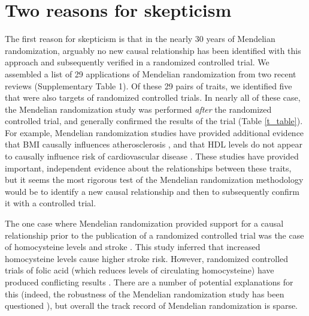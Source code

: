 \documentclass[11pt,titlepage]{article}
\begin{document}
\section{Two reasons for skepticism}
The first reason for skepticism is that in the nearly 30 years of Mendelian randomization, arguably no new causal relationship has been identified with this approach and subsequently verified in a randomized controlled trial. We assembled a list of 29 applications of Mendelian randomization from two recent reviews \citep{Davey-Smith:2014aa, burgess2015mendelian} (Supplementary Table 1). Of these 29 pairs of traits, we identified five that were also targets of randomized controlled trials. In nearly all of these case, the Mendelian randomization study was performed \emph{after} the randomized controlled trial, and generally confirmed the results of the trial (Table \ref{t_table}). For example, Mendelian randomization studies have provided additional evidence that BMI causally influences atherosclerosis \cite{Kivimaki:2008ab}, and that HDL levels do not appear to causally influence risk of cardiovascular disease \cite{Voight:2012aa}. These studies have provided important, independent evidence about the relationships between these traits, but it seems the most rigorous test of the Mendelian randomization methodology would be to identify a new causal relationship and then to subsequently confirm it with a controlled trial.  

The one case where Mendelian randomization provided support for a causal relationship prior to the publication of a randomized controlled trial was the case of homocysteine levels and stroke \citep{Casas:2005aa}. This study inferred that increased homocysteine levels cause higher stroke risk. However, randomized controlled trials of folic acid (which reduces levels of circulating homocysteine) have produced conflicting results \citep{Huo:2015aa, Study-of-the-Effectiveness-of-Additional-Reductions-in-Cholesterol-and-Homocysteine-SEARCH-Collaborative-Group:2010aa}. There are a number of potential explanations for this (indeed, the robustness of the Mendelian randomization study has been questioned \citep{Lewis:2005aa}), but overall the track record of Mendelian randomization is sparse. 
\end{document}
